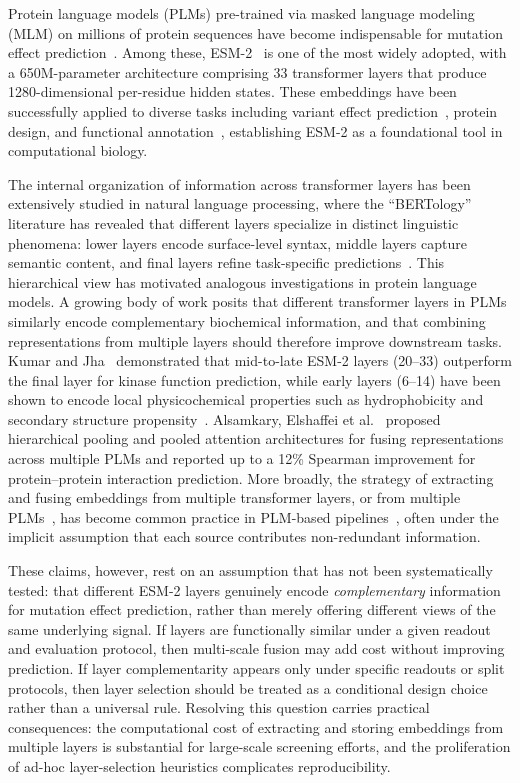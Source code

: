 \documentclass[numbered,webpdf,modern,large]{oup-authoring-template}
\newcommand{\rtwo}[1]{#1}
\begin{document}
Protein language models (PLMs) pre-trained via masked language modeling (MLM) on
millions of protein sequences have become indispensable for mutation effect
prediction~\cite{rives2021biological,meier2021language,lin2023evolutionary}.
Among these, ESM-2~\cite{lin2023evolutionary}
is one of the most widely adopted, with a 650M-parameter architecture comprising 33
transformer layers that produce 1280-dimensional per-residue hidden states. These
embeddings have been successfully applied to diverse tasks including variant effect
prediction~\cite{frazer2021disease,hie2021learning}, protein design, and functional
annotation~\cite{elnaggar2022prottrans,brandes2022proteinbert}, establishing ESM-2 as a
foundational tool in computational biology.

The internal organization of information across transformer layers has been
extensively studied in natural language processing, where the ``BERTology''
literature has revealed that different layers specialize
in distinct linguistic phenomena: lower layers encode surface-level syntax, middle
layers capture semantic content, and final layers refine task-specific
predictions~\rtwo{\cite{rogers2021bertology,tenney2019bert}}.
This hierarchical view has motivated analogous investigations in protein language
models. A growing body of work posits that different transformer layers in PLMs
similarly encode complementary biochemical information, and that combining
representations from multiple layers should therefore improve downstream tasks.
Kumar and Jha~\cite{kumar2025} demonstrated that mid-to-late ESM-2 layers (20--33)
outperform the final layer for kinase function prediction, while early layers
(6--14) have been shown to encode local physicochemical properties such as
hydrophobicity and secondary structure propensity~\cite{detlefsen2022}.
Alsamkary, Elshaffei et al.~\cite{elshaffei2025} proposed hierarchical pooling and
pooled attention architectures for fusing representations across multiple PLMs and
reported up to a 12\% Spearman improvement for protein--protein interaction
prediction. More broadly, the strategy of extracting and fusing embeddings from
multiple transformer layers\rtwo{, or from multiple PLMs~\cite{ko2026fusion,si2024contact},} has
become common practice in PLM-based pipelines~\cite{rao2019tape}, often under the
implicit assumption that each \rtwo{source} contributes non-redundant information.

These claims, however, rest on an assumption that has not been systematically tested:
that different ESM-2 layers genuinely encode \emph{complementary} information for
mutation effect prediction, rather than merely offering different views of the same
underlying signal. If layers are functionally similar under a given readout and
evaluation protocol, then multi-scale fusion may add cost without improving prediction.
If layer complementarity appears only under specific readouts or split protocols,
then layer selection should be treated as a conditional design choice rather than
a universal rule. Resolving this question carries practical
consequences: the computational cost of extracting and storing embeddings from
multiple layers is substantial for large-scale screening efforts, and the
proliferation of ad-hoc layer-selection heuristics complicates reproducibility.
\end{document}
